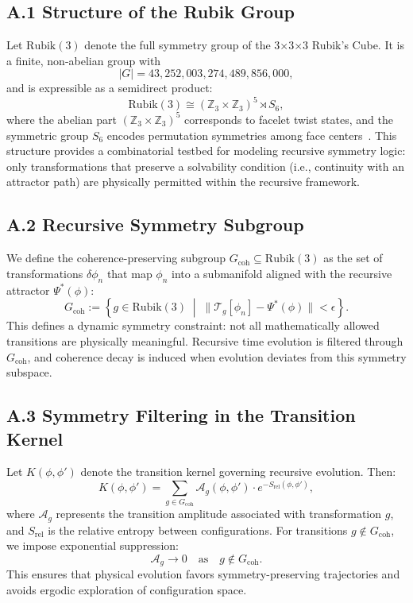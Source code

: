 \documentclass[11pt]{article}
\begin{document}
\subsection*{A.1 Structure of the Rubik Group}

Let $\text{Rubik}(3)$ denote the full symmetry group of the 3×3×3 Rubik’s Cube. It is a finite, non-abelian group with
\[
|G| = 43,252,003,274,489,856,000,
\]
and is expressible as a semidirect product:
\[
\text{Rubik}(3) \cong ( \mathbb{Z}_3 \times \mathbb{Z}_3 )^5 \rtimes S_6,
\]
where the abelian part $(\mathbb{Z}_3 \times \mathbb{Z}_3)^5$ corresponds to facelet twist states, and the symmetric group $S_6$ encodes permutation symmetries among face centers~\cite{joyner2008adventures}. This structure provides a combinatorial testbed for modeling recursive symmetry logic: only transformations that preserve a solvability condition (i.e., continuity with an attractor path) are physically permitted within the recursive framework.

\subsection*{A.2 Recursive Symmetry Subgroup}

We define the coherence-preserving subgroup $G_{\text{coh}} \subseteq \text{Rubik}(3)$ as the set of transformations $\delta \phi_n$ that map $\phi_n$ into a submanifold aligned with the recursive attractor $\Psi^*(\phi)$:
\[
G_{\text{coh}} := \left\{ g \in \text{Rubik}(3) \; \middle| \; \| \mathcal{T}_g[\phi_n] - \Psi^*(\phi) \| < \epsilon \right\}.
\]
This defines a dynamic symmetry constraint: not all mathematically allowed transitions are physically meaningful. Recursive time evolution is filtered through $G_{\text{coh}}$, and coherence decay is induced when evolution deviates from this symmetry subspace.

\subsection*{A.3 Symmetry Filtering in the Transition Kernel}

Let $K(\phi, \phi')$ denote the transition kernel governing recursive evolution. Then:
\[
K(\phi, \phi') = \sum_{g \in G_{\text{coh}}} \mathcal{A}_g(\phi, \phi') \cdot e^{-S_{\text{rel}}(\phi, \phi')},
\]
where $\mathcal{A}_g$ represents the transition amplitude associated with transformation $g$, and $S_{\text{rel}}$ is the relative entropy between configurations. For transitions $g \notin G_{\text{coh}}$, we impose exponential suppression:
\[
\mathcal{A}_g \to 0 \quad \text{as} \quad g \notin G_{\text{coh}}.
\]
This ensures that physical evolution favors symmetry-preserving trajectories and avoids ergodic exploration of configuration space.
\end{document}
